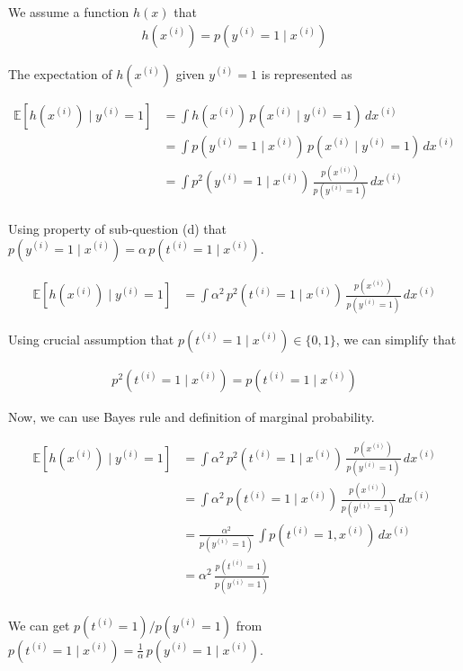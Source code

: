 \begin{answer}
We assume a function $h(x)$ that
\begin{align*}
    h(x^{(i)}) = p(y^{(i)}=1\mid x^{(i)})
\end{align*}

The expectation of $h(x^{(i)})$ given $y^{(i)}=1$ is represented as

\begin{align*}
    \mathbb{E}[h(x^{(i)})\mid y^{(i)}=1] &= \int h(x^{(i)})\,p(x^{(i)}\mid y^{(i)}=1)\,dx^{(i)} \\
    &= \int p(y^{(i)}=1\mid x^{(i)})\,p(x^{(i)}\mid y^{(i)}=1)\,dx^{(i)} \\
    &= \int p^2(y^{(i)}=1\mid x^{(i)})\,\frac{p(x^{(i)})}{p(y^{(i)}=1)}\,dx^{(i)} \\
\end{align*}

Using property of sub-question (d) that $p(y^{(i)}=1\mid x^{(i)}) = \alpha\,p(t^{(i)}=1\mid x^{(i)})$.

\begin{align*}
    \mathbb{E}[h(x^{(i)})\mid y^{(i)}=1] &= \int \alpha^2\,p^2(t^{(i)}=1\mid x^{(i)})\,\frac{p(x^{(i)})}{p(y^{(i)}=1)}\,dx^{(i)}
\end{align*}

Using crucial assumption that $p(t^{(i)}=1\mid x^{(i)})\in\{0,1\}$, we can simplify that

\begin{align*}
    p^2(t^{(i)}=1\mid x^{(i)})=p(t^{(i)}=1\mid x^{(i)})
\end{align*}

Now, we can use Bayes rule and definition of marginal probability.

\begin{align*}
    \mathbb{E}[h(x^{(i)})\mid y^{(i)}=1] &= \int \alpha^2\,p^2(t^{(i)}=1\mid x^{(i)})\,\frac{p(x^{(i)})}{p(y^{(i)}=1)}\,dx^{(i)} \\
    &= \int \alpha^2\,p(t^{(i)}=1\mid x^{(i)})\,\frac{p(x^{(i)})}{p(y^{(i)}=1)}\,dx^{(i)} \\
    &= \frac{\alpha^2}{p(y^{(i)}=1)}\,\int p(t^{(i)}=1, x^{(i)})\,dx^{(i)} \\
    &= \alpha^2\,\frac{p(t^{(i)}=1)}{p(y^{(i)}=1)} \\
\end{align*}

We can get ${p(t^{(i)}=1)}/{p(y^{(i)}=1)}$ from $p(t^{(i)}=1\mid x^{(i)}) = \frac{1}{\alpha}\,p(y^{(i)}=1\mid x^{(i)})$.


\end{answer}
